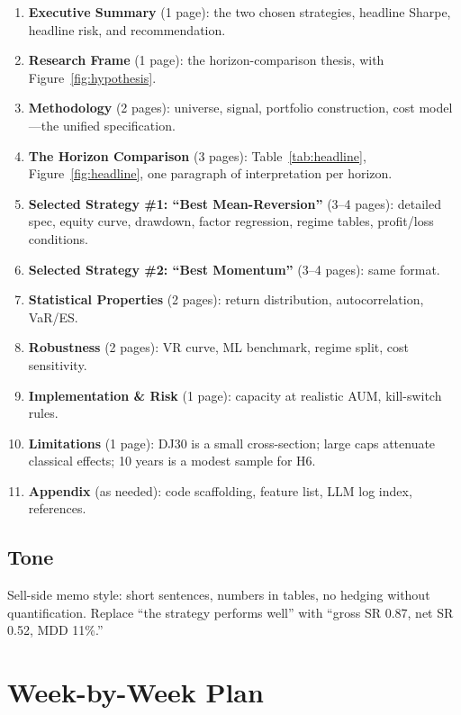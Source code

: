 \documentclass[11pt,letterpaper]{article}
\begin{document}
\begin{enumerate}[leftmargin=*,label=\arabic*.]
  \item \textbf{Executive Summary} (1 page): the two chosen strategies, headline Sharpe, headline risk, and recommendation.
  \item \textbf{Research Frame} (1 page): the horizon-comparison thesis, with Figure~\ref{fig:hypothesis}.
  \item \textbf{Methodology} (2 pages): universe, signal, portfolio construction, cost model---the unified specification.
  \item \textbf{The Horizon Comparison} (3 pages): Table~\ref{tab:headline}, Figure~\ref{fig:headline}, one paragraph of interpretation per horizon.
  \item \textbf{Selected Strategy \#1: ``Best Mean-Reversion''} (3--4 pages): detailed spec, equity curve, drawdown, factor regression, regime tables, profit/loss conditions.
  \item \textbf{Selected Strategy \#2: ``Best Momentum''} (3--4 pages): same format.
  \item \textbf{Statistical Properties} (2 pages): return distribution, autocorrelation, VaR/ES.
  \item \textbf{Robustness} (2 pages): VR curve, ML benchmark, regime split, cost sensitivity.
  \item \textbf{Implementation \& Risk} (1 page): capacity at realistic AUM, kill-switch rules.
  \item \textbf{Limitations} (1 page): DJ30 is a small cross-section; large caps attenuate classical effects; 10 years is a modest sample for H6.
  \item \textbf{Appendix} (as needed): code scaffolding, feature list, LLM log index, references.
\end{enumerate}

\subsection{Tone}

Sell-side memo style: short sentences, numbers in tables, no hedging without quantification. Replace ``the strategy performs well'' with ``gross SR 0.87, net SR 0.52, MDD 11\%.''

\section{Week-by-Week Plan}\label{sec:plan}
\end{document}
